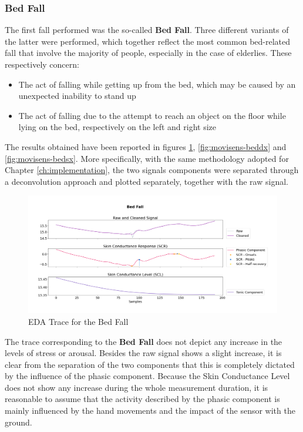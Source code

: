 \subsubsection{Bed Fall}\label{subsubsec:bed-fall}

The first fall performed was the so-called \textbf{Bed Fall}. Three different variants of the latter were performed, which together reflect the most common bed-related fall that involve the majority of people, especially in the case of elderlies. These respectively concern: 

\begin{itemize}
    \item The act of falling while getting up from the bed, which may be caused by an unexpected inability to stand up 
    \item The act of falling due to the attempt to reach an object on the floor while lying on the bed, respectively on the left and right size
\end{itemize}

The results obtained have been reported in figures \ref{fig:movisens-bed}, \ref{fig:movisens-beddx} and \ref{fig:movisens-bedsx}. More specifically, with the same methodology adopted for Chapter \ref{ch:implementation}, the two signals components were separated through a deconvolution approach and plotted separately, together with the raw signal.

\begin{figure}[h!]
    \centering
    \includegraphics[width=\textwidth]{./images/movisens/Bed.png}
    \caption{EDA Trace for the Bed Fall}
    \label{fig:movisens-bed}
\end{figure}

The trace corresponding to the \textbf{Bed Fall} does not depict any increase in the levels of stress or arousal. Besides the raw signal shows a slight increase, it is clear from the separation of the two components that this is completely dictated by the influence of the phasic component. Because the Skin Conductance Level does not show any increase during the whole measurement duration, it is reasonable to assume that the activity described by the phasic component is mainly influenced by the hand movements and the impact of the sensor with the ground.

